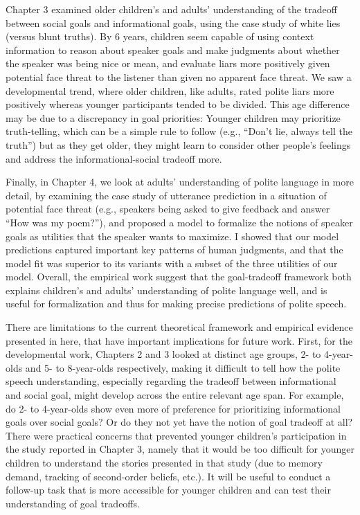 \documentclass[oneside]{report}
\begin{document}
Chapter 3 examined older children's and adults' understanding of the
tradeoff between social goals and informational goals, using the case
study of white lies (versus blunt truths). By 6 years, children seem
capable of using context information to reason about speaker goals and
make judgments about whether the speaker was being nice or mean, and
evaluate liars more positively given potential face threat to the
listener than given no apparent face threat. We saw a developmental
trend, where older children, like adults, rated polite liars more
positively whereas younger participants tended to be divided. This age
difference may be due to a discrepancy in goal priorities: Younger
children may prioritize truth-telling, which can be a simple rule to
follow (e.g., ``Don't lie, always tell the truth'') but as they get
older, they might learn to consider other people's feelings and address
the informational-social tradeoff more.

Finally, in Chapter 4, we look at adults' understanding of polite
language in more detail, by examining the case study of utterance
prediction in a situation of potential face threat (e.g., speakers being
asked to give feedback and answer ``How was my poem?''), and proposed a
model to formalize the notions of speaker goals as utilities that the
speaker wants to maximize. I showed that our model predictions captured
important key patterns of human judgments, and that the model fit was
superior to its variants with a subset of the three utilities of our
model. Overall, the empirical work suggest that the goal-tradeoff
framework both explains children's and adults' understanding of polite
language well, and is useful for formalization and thus for making
precise predictions of polite speech.

There are limitations to the current theoretical framework and empirical
evidence presented in here, that have important implications for future
work. First, for the developmental work, Chapters 2 and 3 looked at
distinct age groups, 2- to 4-year-olds and 5- to 8-year-olds
respectively, making it difficult to tell how the polite speech
understanding, especially regarding the tradeoff between informational
and social goal, might develop across the entire relevant age span. For
example, do 2- to 4-year-olds show even more of preference for
prioritizing informational goals over social goals? Or do they not yet
have the notion of goal tradeoff at all? There were practical concerns
that prevented younger children's participation in the study reported in
Chapter 3, namely that it would be too difficult for younger children to
understand the stories presented in that study (due to memory demand,
tracking of second-order beliefs, etc.). It will be useful to conduct a
follow-up task that is more accessible for younger children and can test
their understanding of goal tradeoffs.
\end{document}

